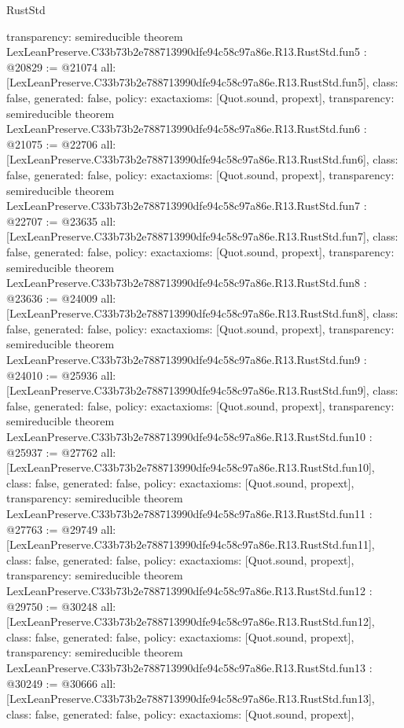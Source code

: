 \begin{lexlean}{RustStd}
\begin{coremodule}
{  transparency: semireducible
}
theorem LexLeanPreserve.C33b73b2e788713990dfe94c58c97a86e.R13.RustStd.fun5 : @20829 := @21074 {
  all: [LexLeanPreserve.C33b73b2e788713990dfe94c58c97a86e.R13.RustStd.fun5],
  class: false,
  generated: false,
  policy: exact{axioms: [Quot.sound, propext]},
  transparency: semireducible
}
theorem LexLeanPreserve.C33b73b2e788713990dfe94c58c97a86e.R13.RustStd.fun6 : @21075 := @22706 {
  all: [LexLeanPreserve.C33b73b2e788713990dfe94c58c97a86e.R13.RustStd.fun6],
  class: false,
  generated: false,
  policy: exact{axioms: [Quot.sound, propext]},
  transparency: semireducible
}
theorem LexLeanPreserve.C33b73b2e788713990dfe94c58c97a86e.R13.RustStd.fun7 : @22707 := @23635 {
  all: [LexLeanPreserve.C33b73b2e788713990dfe94c58c97a86e.R13.RustStd.fun7],
  class: false,
  generated: false,
  policy: exact{axioms: [Quot.sound, propext]},
  transparency: semireducible
}
theorem LexLeanPreserve.C33b73b2e788713990dfe94c58c97a86e.R13.RustStd.fun8 : @23636 := @24009 {
  all: [LexLeanPreserve.C33b73b2e788713990dfe94c58c97a86e.R13.RustStd.fun8],
  class: false,
  generated: false,
  policy: exact{axioms: [Quot.sound, propext]},
  transparency: semireducible
}
theorem LexLeanPreserve.C33b73b2e788713990dfe94c58c97a86e.R13.RustStd.fun9 : @24010 := @25936 {
  all: [LexLeanPreserve.C33b73b2e788713990dfe94c58c97a86e.R13.RustStd.fun9],
  class: false,
  generated: false,
  policy: exact{axioms: [Quot.sound, propext]},
  transparency: semireducible
}
theorem LexLeanPreserve.C33b73b2e788713990dfe94c58c97a86e.R13.RustStd.fun10 : @25937 := @27762 {
  all: [LexLeanPreserve.C33b73b2e788713990dfe94c58c97a86e.R13.RustStd.fun10],
  class: false,
  generated: false,
  policy: exact{axioms: [Quot.sound, propext]},
  transparency: semireducible
}
theorem LexLeanPreserve.C33b73b2e788713990dfe94c58c97a86e.R13.RustStd.fun11 : @27763 := @29749 {
  all: [LexLeanPreserve.C33b73b2e788713990dfe94c58c97a86e.R13.RustStd.fun11],
  class: false,
  generated: false,
  policy: exact{axioms: [Quot.sound, propext]},
  transparency: semireducible
}
theorem LexLeanPreserve.C33b73b2e788713990dfe94c58c97a86e.R13.RustStd.fun12 : @29750 := @30248 {
  all: [LexLeanPreserve.C33b73b2e788713990dfe94c58c97a86e.R13.RustStd.fun12],
  class: false,
  generated: false,
  policy: exact{axioms: [Quot.sound, propext]},
  transparency: semireducible
}
theorem LexLeanPreserve.C33b73b2e788713990dfe94c58c97a86e.R13.RustStd.fun13 : @30249 := @30666 {
  all: [LexLeanPreserve.C33b73b2e788713990dfe94c58c97a86e.R13.RustStd.fun13],
  class: false,
  generated: false,
  policy: exact{axioms: [Quot.sound, propext]},
}
\end{coremodule}
\end{lexlean}
